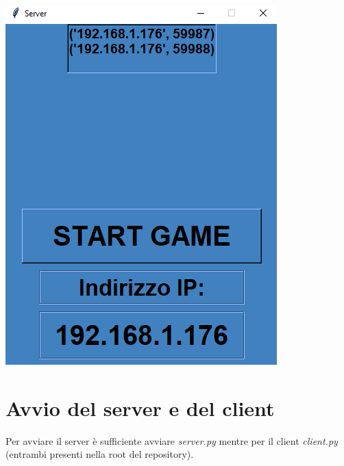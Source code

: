 \documentclass[a4paper,12pt]{report}
\begin{document}
\includegraphics[width=\textwidth]{server.png}

\chapter{Avvio del server e del client}
Per avviare il server è sufficiente avviare \emph{server.py} mentre per il client \emph{client.py} (entrambi presenti nella root del repository).
	
\end{document}
